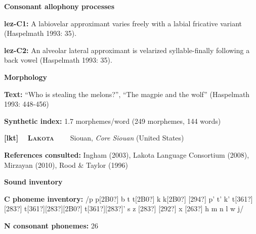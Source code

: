 \begin{styleBody}
\textbf{Consonant allophony processes}
\end{styleBody}

\begin{styleBody}
\textbf{lez-C1: }A labiovelar approximant varies freely with a labial fricative variant (Haspelmath 1993: 35).
\end{styleBody}

\begin{styleBody}
\textbf{lez-C2: }An alveolar lateral approximant is velarized syllable-finally following a back vowel (Haspelmath 1993: 35).
\end{styleBody}

\begin{styleBody}
\textbf{Morphology}
\end{styleBody}

\begin{styleBody}
\textbf{Text:} “Who is stealing the melons?”, “The magpie and the wolf” (Haspelmath 1993: 448-456)
\end{styleBody}

\begin{styleBody}
\textbf{Synthetic index: }1.7 morphemes/word (249 morphemes, 144 words)
\end{styleBody}

\clearpage\begin{styleBody}
\textbf{[lkt] }\ \ \textbf{\textsc{Lakota}}\textbf{\ \ \ \ }Siouan, \textit{Core Siouan} (United States)
\end{styleBody}

\begin{styleBody}
\textbf{References consulted: }Ingham (2003), Lakota Language Consortium (2008), Mirzayan (2010), Rood \& Taylor (1996)
\end{styleBody}

\begin{styleBody}
\textbf{Sound inventory}
\end{styleBody}

\begin{styleBody}
\textbf{C phoneme inventory:} /p p[2B0?] b t t[2B0?] k k[2B0?] [294?] p’ t’ k’ t[361?][283?] t[361?][283?][2B0?] t[361?][283?]’ s z [283?] [292?] x [263?] h m n l w j/
\end{styleBody}

\begin{styleBody}
\textbf{N consonant phonemes:} 26
\end{styleBody}

